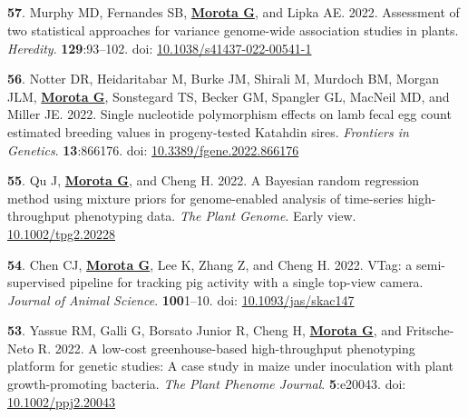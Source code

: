 \documentclass[margin,line,10pt]{res}
\newenvironment{list1}{
  \begin{list}{\ding{113}}{%
      \setlength{\itemsep}{0in}
      \setlength{\parsep}{0in} \setlength{\parskip}{0in}
      \setlength{\topsep}{0in} \setlength{\partopsep}{0in} 
      \setlength{\leftmargin}{0.17in}}}{\end{list}}
\begin{document}
\begin{resume}
\section{}
\begin{list1}

             
   \item [{\bf 57}.] Murphy MD, Fernandes SB, \textbf{\underline{Morota G}}, and Lipka AE. 2022. Assessment of two statistical approaches for variance genome-wide association studies in plants. \emph{Heredity}. \textbf{129}:93–102. doi: \textcolor{blue}{\href{https://doi.org/10.1038/s41437-022-00541-1}{10.1038/s41437-022-00541-1}}  


      \vspace{0.5cm}
     
       \item  [{\bf 56}.]  Notter DR, Heidaritabar M, Burke JM, Shirali M, Murdoch BM, Morgan JLM, \textbf{\underline{Morota G}}, Sonstegard TS, Becker GM, Spangler GL, MacNeil MD, and Miller JE. 2022. Single nucleotide polymorphism effects on lamb fecal egg count estimated breeding values in progeny-tested Katahdin sires. \emph{Frontiers in Genetics}. \textbf{13}:866176. doi: \textcolor{blue}{\href{https://doi.org/10.3389/fgene.2022.866176}{10.3389/fgene.2022.866176}}       

        
         
         \vspace{0.5cm}

\item  [{\bf 55}.] Qu J, \textbf{\underline{Morota G}}, and Cheng H. 2022. A Bayesian random regression method using mixture priors for genome-enabled analysis of time-series high-throughput phenotyping data. \emph{The Plant Genome}. Early view. \textcolor{blue}{\href{https://doi.org/10.1002/tpg2.20228}{10.1002/tpg2.20228}}    

  \vspace{0.5cm}


\item [{\bf 54}.]  Chen CJ, \textbf{\underline{Morota G}}, Lee K, Zhang Z, and Cheng H. 2022. VTag: a semi-supervised pipeline for tracking pig activity with a single top-view camera. \emph{Journal of Animal Science}. \textbf{100}1–10. doi: \textcolor{blue}{\href{https://doi.org/10.1093/jas/skac147}{10.1093/jas/skac147}}  

    \vspace{0.5cm}


\item [{\bf 53}.] Yassue RM, Galli G, Borsato Junior R, Cheng H, \textbf{\underline{Morota G}}, and Fritsche-Neto R. 2022. A low-cost greenhouse-based high-throughput phenotyping platform for genetic studies: A case study in maize under inoculation with plant growth-promoting bacteria. \emph{The Plant Phenome Journal}. \textbf{5}:e20043. doi: \textcolor{blue}{\href{https://doi.org/10.1002/ppj2.20043}{10.1002/ppj2.20043}}  
  

\end{list1}
\end{resume}
\end{document}
